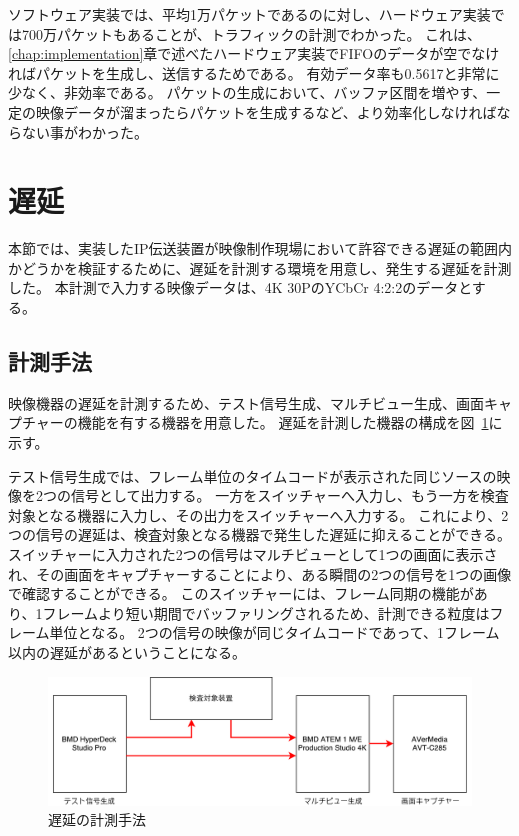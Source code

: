 ソフトウェア実装では、平均1万パケットであるのに対し、ハードウェア実装では700万パケットもあることが、トラフィックの計測でわかった。
これは、\ref{chap:implementation}章で述べたハードウェア実装でFIFOのデータが空でなければパケットを生成し、送信するためである。
有効データ率も0.5617と非常に少なく、非効率である。
パケットの生成において、バッファ区間を増やす、一定の映像データが溜まったらパケットを生成するなど、より効率化しなければならない事がわかった。

\section{遅延}

本節では、実装したIP伝送装置が映像制作現場において許容できる遅延の範囲内かどうかを検証するために、遅延を計測する環境を用意し、発生する遅延を計測した。
本計測で入力する映像データは、4K 30PのYCbCr 4:2:2のデータとする。

\subsection{計測手法}

映像機器の遅延を計測するため、テスト信号生成、マルチビュー生成、画面キャプチャーの機能を有する機器を用意した。
遅延を計測した機器の構成を図~\ref{fig:evaluate-diagram}に示す。

テスト信号生成では、フレーム単位のタイムコードが表示された同じソースの映像を2つの信号として出力する。
一方をスイッチャーへ入力し、もう一方を検査対象となる機器に入力し、その出力をスイッチャーへ入力する。
これにより、2つの信号の遅延は、検査対象となる機器で発生した遅延に抑えることができる。
スイッチャーに入力された2つの信号はマルチビューとして1つの画面に表示され、その画面をキャプチャーすることにより、ある瞬間の2つの信号を1つの画像で確認することができる。
このスイッチャーには、フレーム同期の機能があり、1フレームより短い期間でバッファリングされるため、計測できる粒度はフレーム単位となる。
2つの信号の映像が同じタイムコードであって、1フレーム以内の遅延があるということになる。

\begin{figure}[htbp]
  \begin{center}
    \includegraphics[bb=0 0 697 212,width=15cm]{img/evaluate-diagram.pdf}
  \end{center}
  \caption{遅延の計測手法}
  \label{fig:evaluate-diagram}
\end{figure}

